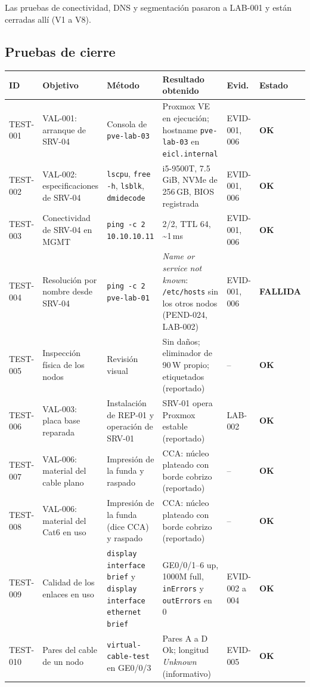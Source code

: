 \documentclass[11pt,a4paper]{article}
\newcommand{\estadobase}[2]{\textcolor{#1}{\textbf{\footnotesize #2}}}
\newcommand{\okk}{\estadobase{okgreen}{OK}}
\newcommand{\fall}{\estadobase{alertred}{FALLIDA}}
\begin{document}
Las pruebas de conectividad, DNS y segmentación pasaron a LAB-001 y están cerradas allí (V1 a V8).

\subsection{Pruebas de cierre}
{\footnotesize\setlength{\tabcolsep}{4pt}
\begin{longtable}{L{1.5cm} L{2.8cm} L{3.0cm} L{3.5cm} L{1.6cm} L{1.9cm}}
  \toprule
  \textbf{ID} & \textbf{Objetivo} & \textbf{Método} & \textbf{Resultado obtenido} & \textbf{Evid.} & \textbf{Estado}\\
  \midrule
  \endhead
  TEST-001 & VAL-001: arranque de SRV-04 & Consola de \texttt{pve-lab-03} & Proxmox VE en ejecución; hostname \texttt{pve-lab-03} en \texttt{eicl.internal} & EVID-001, 006 & \okk\\
  TEST-002 & VAL-002: especificaciones de SRV-04 & \texttt{lscpu}, \texttt{free -h}, \texttt{lsblk}, \texttt{dmidecode} & i5-9500T, 7.5\,GiB, NVMe de 256\,GB, BIOS registrada & EVID-001, 006 & \okk\\
  TEST-003 & Conectividad de SRV-04 en MGMT & \texttt{ping -c 2 10.10.10.11} & 2/2, TTL 64, \textasciitilde1\,ms & EVID-001, 006 & \okk\\
  TEST-004 & Resolución por nombre desde SRV-04 & \texttt{ping -c 2 pve-lab-01} & \emph{Name or service not known}: \texttt{/etc/hosts} sin los otros nodos (PEND-024, LAB-002) & EVID-001, 006 & \fall\\
  TEST-005 & Inspección física de los nodos & Revisión visual & Sin daños; eliminador de 90\,W propio; etiquetados (reportado) & -- & \okk\\
  TEST-006 & VAL-003: placa base reparada & Instalación de REP-01 y operación de SRV-01 & SRV-01 opera Proxmox estable (reportado) & LAB-002 & \okk\\
  TEST-007 & VAL-006: material del cable plano & Impresión de la funda y raspado & CCA: núcleo plateado con borde cobrizo (reportado) & -- & \okk\\
  TEST-008 & VAL-006: material del Cat6 en uso & Impresión de la funda (dice CCA) y raspado & CCA: núcleo plateado con borde cobrizo (reportado) & -- & \okk\\
  TEST-009 & Calidad de los enlaces en uso & \texttt{display interface brief} y \texttt{display interface ethernet brief} & GE0/0/1--6 up, 1000M full, \texttt{inErrors} y \texttt{outErrors} en 0 & EVID-002 a 004 & \okk\\
  TEST-010 & Pares del cable de un nodo & \texttt{virtual-cable-test} en GE0/0/3 & Pares A a D Ok; longitud \emph{Unknown} (informativo) & EVID-005 & \okk\\
  \bottomrule
\end{longtable}
}
\end{document}
